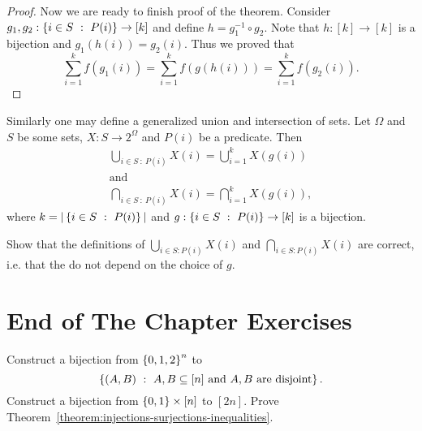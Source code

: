 \begin{proof}
  Now we are ready to finish proof of the theorem.
  Consider $g_1, g_2 : \set[P(i)]{i \in S} \to [k]$ and define
  $h = g_1^{-1} \circ g_2$. Note that $h : [k] \to [k]$ is a bijection and
  $g_1(h(i)) = g_2(i)$. Thus we proved that
  \[
    \sum_{i = 1}^k f(g_1(i)) = \sum_{i = 1}^k f(g(h(i))) =
    \sum_{i = 1}^k f(g_2(i)).
  \]
\end{proof}

Similarly one may define a generalized union and intersection of sets.
Let $\Omega$ and $S$ be some sets, $X : S \to 2^\Omega$ and $P(i)$ be a
predicate. Then
\begin{gather*}
  \bigcup_{i \in S ~:~ P(i)} X(i) = \bigcup_{i = 1}^k X(g(i)) \\
  \text{and}\\
  \bigcap_{i \in S ~:~ P(i)} X(i) = \bigcap_{i = 1}^k X(g(i)),
\end{gather*}
where $k = |\set[P(i)]{i \in S}|$ and $g : \set[P(i)]{i \in S} \to [k]$ is a
bijection.

\begin{exercise}
  Show that the definitions of $\bigcup_{i \in S : P(i)} X(i)$ and
  $\bigcap_{i \in S : P(i)} X(i)$ are correct,
  i.e. that the do not depend on the choice of $g$.
\end{exercise}

\section*{End of The Chapter Exercises}
\begin{exercises}
  \exercise Construct a bijection from $\set{0, 1, 2}^n$ to
    $$\set[{A, B \subseteq [n] \text{ and } A, B \text{ are
    disjoint}}]{(A, B)}.$$
  \exercise Construct a bijection from $\set{0, 1} \times [n]$ to $[2n]$.
  \exercise Prove Theorem~\ref{theorem:injections-surjections-inequalities}.
\end{exercises}
